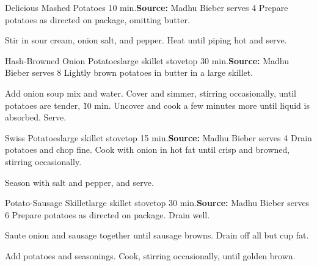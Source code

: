 \begin{recipe}{Delicious Mashed Potatoes}{ \hfill 10 min.}{\textbf{Source:} Madhu Bieber \hfill serves 4}
 Prepare potatoes as directed on package, omitting butter.

 Stir in sour cream, onion salt, and pepper. Heat until piping hot and serve.
\end{recipe}

\begin{recipe}{Hash-Browned Onion Potatoes}{large skillet \hfill stovetop \hfill 30 min.}{\textbf{Source:} Madhu Bieber \hfill serves 8}
 Lightly brown potatoes in butter in a large skillet.

 Add onion soup mix and water. Cover and simmer, stirring occasionally, until potatoes are tender, \~10 min. Uncover and cook a few minutes more until liquid is absorbed. Serve.
\end{recipe}

\begin{recipe}{Swiss Potatoes}{large skillet \hfill stovetop \hfill 15 min.}{\textbf{Source:} Madhu Bieber \hfill serves 4}
 Drain potatoes and chop fine. Cook with onion in hot fat until crisp and browned, stirring occasionally.

 Season with salt and pepper, and serve.
\end{recipe}

\begin{recipe}{Potato-Sausage Skillet}{large skillet \hfill stovetop \hfill 30 min.}{\textbf{Source:} Madhu Bieber \hfill serves 6}
 Prepare potatoes as directed on package. Drain well.

 Saute onion and sausage together until sausage browns. Drain off all but  cup fat.

 Add potatoes and seasonings. Cook, stirring occasionally, until golden brown.
\end{recipe}

